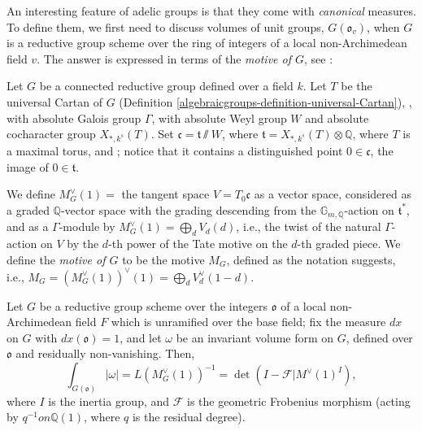 An interesting feature of adelic groups is that they come with \emph{canonical} measures. To define them, we first need to discuss volumes of unit groups, $G(\mathfrak o_v)$, when $G$ is a reductive group scheme over the ring of integers of a local non-Archimedean field $v$. The answer is expressed in terms of the \emph{motive of $G$}, see \cite{Gross-motive}:

\begin{definition}
 \label{definition-motive-G}
Let $G$ be a connected reductive group defined over a field $k$. Let $T$ be the universal Cartan of $G$ (Definition \ref{algebraicgroups-definition-universal-Cartan}), , with absolute Galois group $\Gamma$, with absolute Weyl group $W$ and absolute cocharacter group $X_{*,k^s}(T)$. Set $\mathfrak c = \mathfrak t\sslash W$, where $\mathfrak t = X_{*,k^s}(T) \otimes \mathbb Q$, where $T$ is a maximal torus, and ; notice that it contains a distinguished point $0\in \mathfrak c$, the image of $0\in \mathfrak t$. 

We define $M_G^\vee(1) = $ the tangent space $V=T_0\mathfrak c$ as a vector space, considered as a graded $\mathbb Q$-vector space with the grading descending from the $\mathbb G_{m, \mathbb Q}$-action on $\mathfrak t^*$, and as a $\Gamma$-module by $M_G^\vee(1)  = \bigoplus_d V_d(d)$, i.e., the twist of the natural $\Gamma$-action on $V$ by the $d$-th power of the Tate motive on the $d$-th graded piece. We define the {\it motive of $G$} to be the motive $M_G$, defined as the notation suggests, i.e., $M_G = (M_G^\vee(1))^\vee(1) = \bigoplus_d V_d^\vee(1-d)$.
\end{definition}


\begin{proposition}
 \label{proposition-measure-integers}
Let $G$ be a reductive group scheme over the integers $\mathfrak o$ of a local non-Archimedean field $F$ which is unramified over the base field; fix the measure $dx$ on $G$ with $dx(\mathfrak o)=1$, and let $\omega$ be an invariant volume form on $G$, defined over $\mathfrak o$ and residually non-vanishing. Then,
\begin{equation}
 \label{equation-measure-integers}
 \int_{G(\mathfrak o)} |\omega| = L(M_G^\vee(1))^{-1} = \det(I-\mathcal F|M^\vee(1)^I), 
\end{equation}
where $I$ is the inertia group, and $\mathcal F$ is the geometric Frobenius morphism (acting by $q^{-1} on \mathbb Q(1)$, where $q$ is the residual degree). 
\end{proposition}

